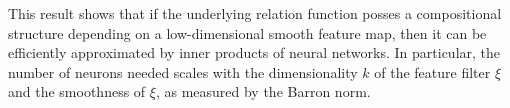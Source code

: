 This result shows that if the underlying relation function posses a compositional structure depending on a low-dimensional smooth feature map, then it can be efficiently approximated by inner products of neural networks. In particular, the number of neurons needed scales with the dimensionality $k$ of the feature filter $\xi$ and the smoothness of $\xi$, as measured by the Barron norm.



